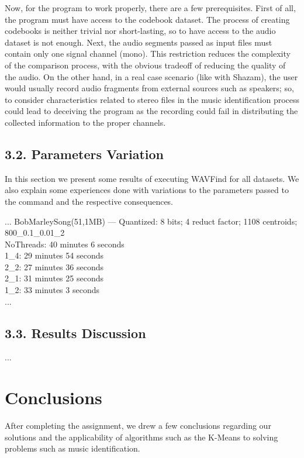 \documentclass[12pt]{article}
\begin{document}
Now, for the program to work properly, there are a few prerequisites.
First of all, the program must have access to the codebook dataset.
The process of creating codebooks is neither trivial nor short-lasting, so to 
have access to the audio dataset is not enough.
Next, the audio segments passed as input files must contain only one signal 
channel (mono).
This restriction reduces the complexity of the comparison process, with the
obvious tradeoff of reducing the quality of the audio.
On the other hand, in a real case scenario (like with Shazam), the user would
usually record audio fragments from external sources such as speakers; so, to 
consider characteristics related to stereo files in the music identification 
process could lead to deceiving the program as the recording could fail in 
distributing the collected information to the proper channels.

\subsection*{3.2. Parameters Variation}

In this section we present some results of executing WAVFind for all datasets.
We also explain some experiences done with variations to the parameters passed
to the command and the respective consequences.

...
BobMarleySong(51,1MB) --- Quantized: 8 bits; 4 reduct factor; 1108 centroids; 800\_0.1\_0.01\_2\\
NoThreads: 40 minutes 6 seconds\\
1\_4: 29 minutes 54 seconds\\
2\_2: 27 minutes 36 seconds\\
2\_1: 31 minutes 25 seconds\\
1\_2: 33 minutes 3 seconds\\
...

\subsection*{3.3. Results Discussion}

...

\newpage
\section*{Conclusions}

After completing the assignment, we drew a few conclusions regarding our 
solutions and the applicability of algorithms such as the K-Means to solving
problems such as music identification.
\end{document}
